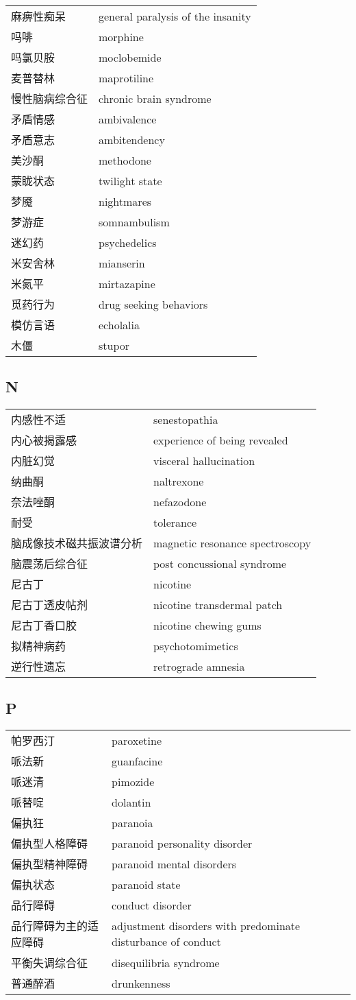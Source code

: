 \begin{longtable}[]{@{}ll@{}}
\toprule
\endhead
麻痹性痴呆 & general paralysis of the insanity\tabularnewline
吗啡 & morphine\tabularnewline
吗氯贝胺 & moclobemide\tabularnewline
麦普替林 & maprotiline\tabularnewline
慢性脑病综合征 & chronic brain syndrome\tabularnewline
矛盾情感 & ambivalence\tabularnewline
矛盾意志 & ambitendency\tabularnewline
美沙酮 & methodone\tabularnewline
蒙眬状态 & twilight state\tabularnewline
梦魇 & nightmares\tabularnewline
梦游症 & somnambulism\tabularnewline
迷幻药 & psychedelics\tabularnewline
米安舍林 & mianserin\tabularnewline
米氮平 & mirtazapine\tabularnewline
觅药行为 & drug seeking behaviors\tabularnewline
模仿言语 & echolalia\tabularnewline
木僵 & stupor\tabularnewline
\bottomrule
\end{longtable}

\subsection*{N}

\begin{longtable}[]{@{}ll@{}}
\toprule
\endhead
内感性不适 & senestopathia\tabularnewline
内心被揭露感 & experience of being revealed\tabularnewline
内脏幻觉 & visceral hallucination\tabularnewline
纳曲酮 & naltrexone\tabularnewline
奈法唑酮 & nefazodone\tabularnewline
耐受 & tolerance\tabularnewline
脑成像技术磁共振波谱分析 & magnetic resonance
spectroscopy\tabularnewline
脑震荡后综合征 & post concussional syndrome\tabularnewline
尼古丁 & nicotine\tabularnewline
尼古丁透皮帖剂 & nicotine transdermal patch\tabularnewline
尼古丁香口胶 & nicotine chewing gums\tabularnewline
拟精神病药 & psychotomimetics\tabularnewline
逆行性遗忘 & retrograde amnesia\tabularnewline
\bottomrule
\end{longtable}

\subsection*{P}

\begin{longtable}[]{lp{6cm}}
\toprule
\endhead
帕罗西汀 & paroxetine\tabularnewline
哌法新 & guanfacine\tabularnewline
哌迷清 & pimozide\tabularnewline
哌替啶 & dolantin\tabularnewline
偏执狂 & paranoia\tabularnewline
偏执型人格障碍 & paranoid personality disorder\tabularnewline
偏执型精神障碍 & paranoid mental disorders\tabularnewline
偏执状态 & paranoid state\tabularnewline
品行障碍 & conduct disorder\tabularnewline
品行障碍为主的适应障碍 & adjustment disorders with predominate
disturbance of conduct\tabularnewline
平衡失调综合征 & disequilibria syndrome\tabularnewline
普通醉酒 & drunkenness\tabularnewline
\bottomrule
\end{longtable}

